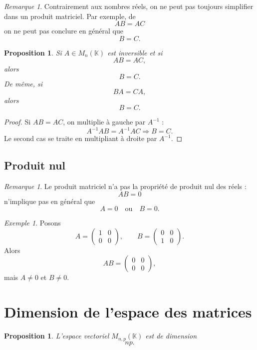 \documentclass[11pt,a4paper]{article}
\newtheorem{proposition}[definition]{Proposition}
\theoremstyle{remark}
\newtheorem{remarque}[definition]{Remarque}
\newtheorem{exemple}[definition]{Exemple}
\newcommand{\K}{\mathbb{K}}
\begin{document}
\begin{remarque}
Contrairement aux nombres réels, on ne peut pas toujours simplifier dans un produit matriciel. Par exemple, de
\[
AB=AC
\]
on ne peut pas conclure en général que
\[
B=C.
\]
\end{remarque}

\begin{proposition}
Si \(A\in M_n(\K)\) est inversible et si
\[
AB=AC,
\]
alors
\[
B=C.
\]
De même, si
\[
BA=CA,
\]
alors
\[
B=C.
\]
\end{proposition}

\begin{proof}
Si \(AB=AC\), on multiplie à gauche par \(A^{-1}\) :
\[
A^{-1}AB=A^{-1}AC
\Longrightarrow
B=C.
\]
Le second cas se traite en multipliant à droite par \(A^{-1}\).
\end{proof}

\subsection{Produit nul}

\begin{remarque}
Le produit matriciel n’a pas la propriété de produit nul des réels :
\[
AB=0
\]
n’implique pas en général que
\[
A=0 \quad \text{ou} \quad B=0.
\]
\end{remarque}

\begin{exemple}
Posons
\[
A=
\begin{pmatrix}
1 & 0\\
0 & 0
\end{pmatrix},
\qquad
B=
\begin{pmatrix}
0 & 0\\
1 & 0
\end{pmatrix}.
\]
Alors
\[
AB=
\begin{pmatrix}
0 & 0\\
0 & 0
\end{pmatrix},
\]
mais \(A\neq 0\) et \(B\neq 0\).
\end{exemple}

\section{Dimension de l’espace des matrices}

\begin{proposition}
L’espace vectoriel \(M_{n,p}(\K)\) est de dimension
\[
np.
\]
\end{proposition}
\end{document}
